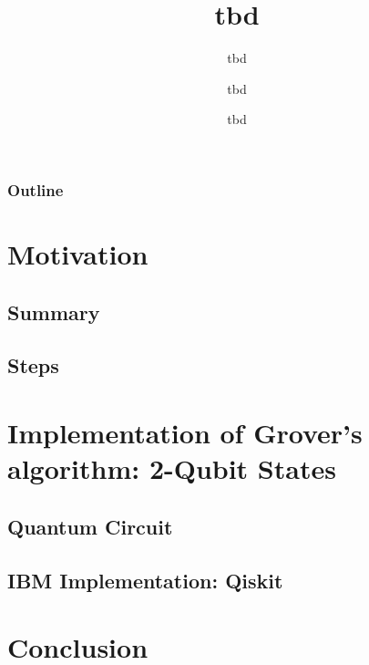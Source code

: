 \documentclass[aspectratio=169]{beamer}
\title{tbd}
\subtitle{tbd}
\date[tbd]{tbd}
\author[jmaunon]{tbd}
\begin{document}
\begin{frame}
\titlepage
\end{frame}


\begin{frame}[plain]
\frametitle{Outline}
\tableofcontents

\end{frame}


%


\section{Motivation}


\subsection{Summary}


\subsection{Steps}





\section{Implementation of Grover's algorithm: 2-Qubit States}
\subsection{Quantum Circuit}

\subsection{IBM Implementation: Qiskit}

\section{Conclusion}
\end{document}
